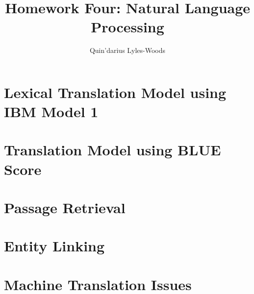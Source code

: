\documentclass{article}
\title{Homework Four: Natural Language Processing}
\author{Quin'darius Lyles-Woods}
\begin{document}
\maketitle
\section{Lexical Translation Model using IBM Model 1}

\section{Translation Model using BLUE Score}

\section{Passage Retrieval}

\section{Entity Linking}

\section{Machine Translation Issues}

\end{document}
